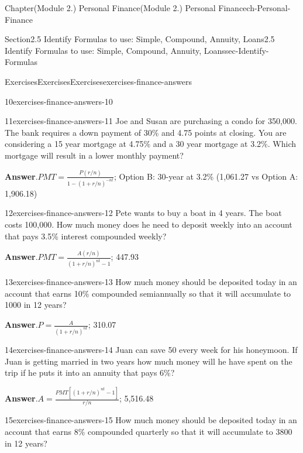 \documentclass[oneside,10pt,]{book}
\newcommand{\blocktitlefont}{\relax}
\begin{document}
\begin{chapterptx}{Chapter}{(Module 2.) Personal Finance}{}{(Module 2.) Personal Finance}{}{}{ch-Personal-Finance}
\begin{sectionptx}{Section}{2.5 Identify Formulas to use: Simple, Compound, Annuity, Loans}{}{2.5 Identify Formulas to use: Simple, Compound, Annuity, Loans}{}{}{sec-Identify-Formulas}
\begin{exercises-subsection-numberless}{Exercises}{Exercises}{}{Exercises}{}{}{exercises-finance-answers}
\begin{divisionexercise}{10}{}{}{exercises-finance-answers-10}
\end{divisionexercise}%
\begin{divisionexercise}{11}{}{}{exercises-finance-answers-11}%
Joe and Susan are purchasing a condo for \textdollar{}350,000. The bank requires a down payment of 30\% and 4.75 points at closing. You are considering a 15 year mortgage at 4.75\% and a 30 year mortgage at 3.2\%. Which mortgage will result in a lower monthly payment?%
\par\smallskip%
\noindent\textbf{\blocktitlefont Answer}.\hypertarget{exercises-finance-answers-11-2}{}\quad{}\(PMT = \frac{P(r/n)}{1-(1+r/n)^{-nt}}\);  Option B: 30-year at 3.2\% (\textdollar{}1,061.27 vs Option A: \textdollar{}1,906.18)%
\end{divisionexercise}%
\begin{divisionexercise}{12}{}{}{exercises-finance-answers-12}%
Pete wants to buy a boat in 4 years. The boat costs \textdollar{}100,000. How much money does he need to deposit weekly into an account that pays 3.5\% interest compounded weekly?%
\par\smallskip%
\noindent\textbf{\blocktitlefont Answer}.\hypertarget{exercises-finance-answers-12-2}{}\quad{}\(PMT = \frac{A(r/n)}{(1+r/n)^{nt}-1}\); \textdollar{}447.93%
\end{divisionexercise}%
\begin{divisionexercise}{13}{}{}{exercises-finance-answers-13}%
How much money should be deposited today in an account that earns 10\% compounded semiannually so that it will accumulate to \textdollar{} 1000 in 12 years?%
\par\smallskip%
\noindent\textbf{\blocktitlefont Answer}.\hypertarget{exercises-finance-answers-13-2}{}\quad{}\(P = \frac{A}{(1+r/n)^{nt}}\); \textdollar{}310.07%
\end{divisionexercise}%
\begin{divisionexercise}{14}{}{}{exercises-finance-answers-14}%
Juan can save \textdollar{}50 every week for his honeymoon. If Juan is getting married in two years how much money will he have spent on the trip if he puts it into an annuity that pays 6\%?%
\par\smallskip%
\noindent\textbf{\blocktitlefont Answer}.\hypertarget{exercises-finance-answers-14-2}{}\quad{}\(A = \frac{PMT[(1+r/n)^{nt}-1]}{r/n}\); \textdollar{}5,516.48%
\end{divisionexercise}%
\begin{divisionexercise}{15}{}{}{exercises-finance-answers-15}%
How much money should be deposited today in an account that earns 8\% compounded quarterly so that it will accumulate to \textdollar{} 3800 in 12 years?%

\end{divisionexercise}
\end{exercises-subsection-numberless}
\end{sectionptx}
\end{chapterptx}
\end{document}
